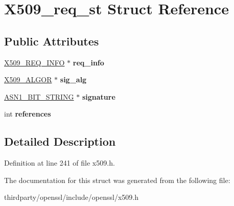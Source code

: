 \hypertarget{struct_x509__req__st}{}\section{X509\+\_\+req\+\_\+st Struct Reference}
\label{struct_x509__req__st}
\subsection*{Public Attributes}
\begin{DoxyCompactItemize}
\item 
\mbox{\label{struct_x509__req__st_acabf08f567bc1a05244378f6b9ce4ce0}} 
\hyperlink{struct_x509__req__info__st}{X509\+\_\+\+R\+E\+Q\+\_\+\+I\+N\+FO} $\ast$ {\bfseries req\+\_\+info}
\item 
\mbox{\label{struct_x509__req__st_aece99c32f3a4dfaae643110bf2f8a8f6}} 
\hyperlink{struct_x509__algor__st}{X509\+\_\+\+A\+L\+G\+OR} $\ast$ {\bfseries sig\+\_\+alg}
\item 
\mbox{\label{struct_x509__req__st_a43ddd2fab56363b07b095e6f1a6d43d1}} 
\hyperlink{structasn1__string__st}{A\+S\+N1\+\_\+\+B\+I\+T\+\_\+\+S\+T\+R\+I\+NG} $\ast$ {\bfseries signature}
\item 
\mbox{\label{struct_x509__req__st_a4c2c07b36957fd3bb1ec804265a0184d}} 
int {\bfseries references}
\end{DoxyCompactItemize}


\subsection{Detailed Description}


Definition at line 241 of file x509.\+h.



The documentation for this struct was generated from the following file\+:\begin{DoxyCompactItemize}
\item 
thirdparty/openssl/include/openssl/x509.\+h\end{DoxyCompactItemize}
